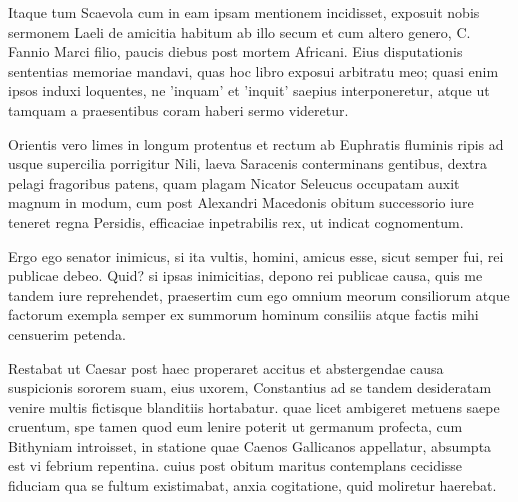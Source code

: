 \documentclass[12pt]{book}
\begin{document}
Itaque tum Scaevola cum in eam ipsam mentionem incidisset, exposuit nobis sermonem Laeli de amicitia habitum ab illo secum et cum altero genero, C. Fannio Marci filio, paucis diebus post mortem Africani. Eius disputationis sententias memoriae mandavi, quas hoc libro exposui arbitratu meo; quasi enim ipsos induxi loquentes, ne 'inquam' et 'inquit' saepius interponeretur, atque ut tamquam a praesentibus coram haberi sermo videretur.

Orientis vero limes in longum protentus et rectum ab Euphratis fluminis ripis ad usque supercilia porrigitur Nili, laeva Saracenis conterminans gentibus, dextra pelagi fragoribus patens, quam plagam Nicator Seleucus occupatam auxit magnum in modum, cum post Alexandri Macedonis obitum successorio iure teneret regna Persidis, efficaciae inpetrabilis rex, ut indicat cognomentum.

Ergo ego senator inimicus, si ita vultis, homini, amicus esse, sicut semper fui, rei publicae debeo. Quid? si ipsas inimicitias, depono rei publicae causa, quis me tandem iure reprehendet, praesertim cum ego omnium meorum consiliorum atque factorum exempla semper ex summorum hominum consiliis atque factis mihi censuerim petenda.

Restabat ut Caesar post haec properaret accitus et abstergendae causa suspicionis sororem suam, eius uxorem, Constantius ad se tandem desideratam venire multis fictisque blanditiis hortabatur. quae licet ambigeret metuens saepe cruentum, spe tamen quod eum lenire poterit ut germanum profecta, cum Bithyniam introisset, in statione quae Caenos Gallicanos appellatur, absumpta est vi febrium repentina. cuius post obitum maritus contemplans cecidisse fiduciam qua se fultum existimabat, anxia cogitatione, quid moliretur haerebat.

\newpage


\null
\thispagestyle{empty}

\newpage

\null
\thispagestyle{empty}



\nocite{*}

\end{document}
